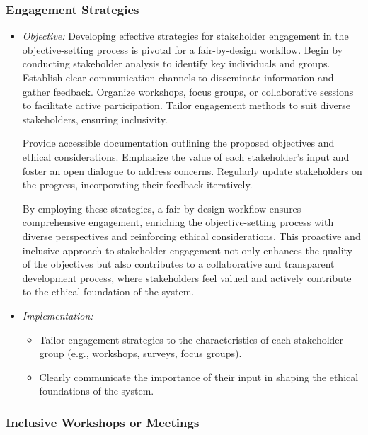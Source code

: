 \subsubsection{Engagement Strategies}

\begin{itemize}

    \item \emph{Objective:} Developing effective strategies for stakeholder engagement in the objective-setting process is pivotal for a fair-by-design workflow. Begin by conducting stakeholder analysis to identify key individuals and groups. Establish clear communication channels to disseminate information and gather feedback. Organize workshops, focus groups, or collaborative sessions to facilitate active participation. Tailor engagement methods to suit diverse stakeholders, ensuring inclusivity.

    Provide accessible documentation outlining the proposed objectives and ethical considerations. Emphasize the value of each stakeholder's input and foster an open dialogue to address concerns. Regularly update stakeholders on the progress, incorporating their feedback iteratively.
    
    By employing these strategies, a fair-by-design workflow ensures comprehensive engagement, enriching the objective-setting process with diverse perspectives and reinforcing ethical considerations. This proactive and inclusive approach to stakeholder engagement not only enhances the quality of the objectives but also contributes to a collaborative and transparent development process, where stakeholders feel valued and actively contribute to the ethical foundation of the system.

    \item \emph{Implementation:}

    \begin{itemize}

        \item Tailor engagement strategies to the characteristics of each stakeholder group (e.g., workshops, surveys, focus groups).

        \item Clearly communicate the importance of their input in shaping the ethical foundations of the system.

    \end{itemize}

\end{itemize}

\subsubsection{Inclusive Workshops or Meetings}

